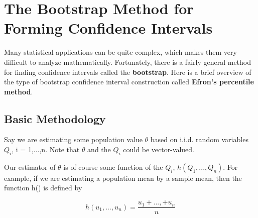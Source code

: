 % 
% 
% 

\section{The Bootstrap Method for Forming Confidence Intervals}

Many statistical applications can be quite complex, which makes them very
difficult to analyze mathematically.  Fortunately, there is a fairly
general method for finding confidence intervals called the {\bf
bootstrap}.  Here is a brief overview of the type of bootstrap
confidence interval construction called {\bf Efron's percentile method}.

\subsection{Basic Methodology}
\label{basicboot}

Say we are estimating some population value $\theta$ based on i.i.d.
random variables $Q_i$, i = 1,...,n.  Note that $\theta$ and the $Q_i$
could be vector-valued.

Our estimator of $\theta$ is of course some function of the $Q_i$, 
$h(Q_1,...,Q_n)$.  For example, if we are estimating a population mean
by a sample mean, then the function h() is defined by

\begin{equation}
h(u_1,...,u_n) = \frac{u_1+...,+u_n}{n}
\end{equation}


